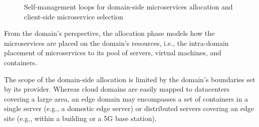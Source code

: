 \begin{figure}[thbp]
	\centering
	\captionsetup[subfigure]{width=0.4\textwidth}	
	\null\hfill
	\captionsetup[subfigure]{width=0.4\textwidth}	
	\hfill
	\hfill\null
	\caption{Self-management loops for domain-side microservices allocation and client-side microservice selection}\label{fig:allocation-loops}
\end{figure}

From the domain's perspective, the allocation phase models how the microservices are placed on the domain's resources, i.e., the intra-domain placement of microservices to its pool of servers, virtual machines, and containers. 

The scope of the domain-side allocation is limited by the domain's boundaries set by its provider. Whereas cloud domains are easily mapped to datacenters covering a large area, an edge domain may encompasses a set of containers in a single server (e.g., a domestic edge server) or distributed servers covering an edge site (e.g., within a building or a 5G base station).



